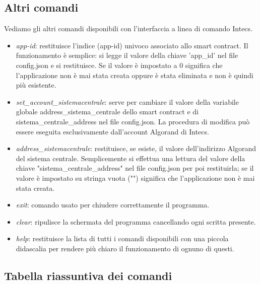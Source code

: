 \subsection{Altri comandi}
Vediamo gli altri comandi disponibili con l'interfaccia a linea di comando Intecs.
\begin{itemize}
    \item \textit{app-id}: restituisce l'indice (app-id) univoco associato allo smart contract. Il funzionamento è semplice: si legge il valore della chiave 'app\_id' nel file config.json e si restituisce. Se il valore è impostato a 0 significa che l'applicazione non è mai stata creata oppure è stata eliminata e non è quindi più esistente.
    \item \textit{set\_account\_sistemacentrale}: serve per cambiare il valore della variabile globale address\_sistema\_centrale dello smart contract e di sistema\_centrale\_address nel file config.json. La procedura di modifica può essere eseguita esclusivamente dall'account Algorand di Intecs.
    \item \textit{address\_sistemacentrale}: restituisce, se esiste, il valore dell'indirizzo Algorand del sistema centrale. Semplicemente si effettua una lettura del valore della chiave "sistema\_centrale\_address" nel file config.json per poi restituirla; se il valore è impostato su stringa vuota ("") significa che l'applicazione non è mai stata creata.
    \item \textit{exit}: comando usato per chiudere correttamente il programma.
    \item \textit{clear}: ripulisce la schermata del programma cancellando ogni scritta presente.
    \item \textit{help}: restituisce la lista di tutti i comandi disponibili con una piccola didascalia per rendere più chiaro il funzionamento di ognuno di questi.
\end{itemize}

\subsection{Tabella riassuntiva dei comandi}
